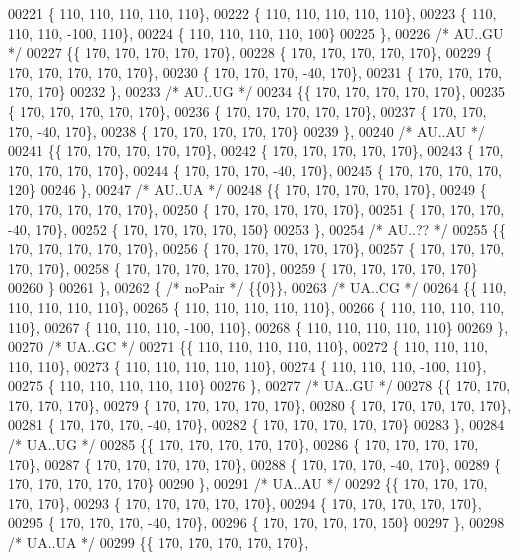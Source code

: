 \begin{DoxyCode}
00221 \{ 110, 110, 110, 110, 110\},
00222 \{ 110, 110, 110, 110, 110\},
00223 \{ 110, 110, 110, -100, 110\},
00224 \{ 110, 110, 110, 110, 100\}
00225 \},
00226 \textcolor{comment}{/* AU..GU */}
00227 \{\{ 170, 170, 170, 170, 170\},
00228 \{ 170, 170, 170, 170, 170\},
00229 \{ 170, 170, 170, 170, 170\},
00230 \{ 170, 170, 170, -40, 170\},
00231 \{ 170, 170, 170, 170, 170\}
00232 \},
00233 \textcolor{comment}{/* AU..UG */}
00234 \{\{ 170, 170, 170, 170, 170\},
00235 \{ 170, 170, 170, 170, 170\},
00236 \{ 170, 170, 170, 170, 170\},
00237 \{ 170, 170, 170, -40, 170\},
00238 \{ 170, 170, 170, 170, 170\}
00239 \},
00240 \textcolor{comment}{/* AU..AU */}
00241 \{\{ 170, 170, 170, 170, 170\},
00242 \{ 170, 170, 170, 170, 170\},
00243 \{ 170, 170, 170, 170, 170\},
00244 \{ 170, 170, 170, -40, 170\},
00245 \{ 170, 170, 170, 170, 120\}
00246 \},
00247 \textcolor{comment}{/* AU..UA */}
00248 \{\{ 170, 170, 170, 170, 170\},
00249 \{ 170, 170, 170, 170, 170\},
00250 \{ 170, 170, 170, 170, 170\},
00251 \{ 170, 170, 170, -40, 170\},
00252 \{ 170, 170, 170, 170, 150\}
00253 \},
00254 \textcolor{comment}{/* AU..?? */}
00255 \{\{ 170, 170, 170, 170, 170\},
00256 \{ 170, 170, 170, 170, 170\},
00257 \{ 170, 170, 170, 170, 170\},
00258 \{ 170, 170, 170, 170, 170\},
00259 \{ 170, 170, 170, 170, 170\}
00260 \}
00261 \},
00262 \{ \textcolor{comment}{/* noPair */} \{\{0\}\},
00263 \textcolor{comment}{/* UA..CG */}
00264 \{\{ 110, 110, 110, 110, 110\},
00265 \{ 110, 110, 110, 110, 110\},
00266 \{ 110, 110, 110, 110, 110\},
00267 \{ 110, 110, 110, -100, 110\},
00268 \{ 110, 110, 110, 110, 110\}
00269 \},
00270 \textcolor{comment}{/* UA..GC */}
00271 \{\{ 110, 110, 110, 110, 110\},
00272 \{ 110, 110, 110, 110, 110\},
00273 \{ 110, 110, 110, 110, 110\},
00274 \{ 110, 110, 110, -100, 110\},
00275 \{ 110, 110, 110, 110, 110\}
00276 \},
00277 \textcolor{comment}{/* UA..GU */}
00278 \{\{ 170, 170, 170, 170, 170\},
00279 \{ 170, 170, 170, 170, 170\},
00280 \{ 170, 170, 170, 170, 170\},
00281 \{ 170, 170, 170, -40, 170\},
00282 \{ 170, 170, 170, 170, 170\}
00283 \},
00284 \textcolor{comment}{/* UA..UG */}
00285 \{\{ 170, 170, 170, 170, 170\},
00286 \{ 170, 170, 170, 170, 170\},
00287 \{ 170, 170, 170, 170, 170\},
00288 \{ 170, 170, 170, -40, 170\},
00289 \{ 170, 170, 170, 170, 170\}
00290 \},
00291 \textcolor{comment}{/* UA..AU */}
00292 \{\{ 170, 170, 170, 170, 170\},
00293 \{ 170, 170, 170, 170, 170\},
00294 \{ 170, 170, 170, 170, 170\},
00295 \{ 170, 170, 170, -40, 170\},
00296 \{ 170, 170, 170, 170, 150\}
00297 \},
00298 \textcolor{comment}{/* UA..UA */}
00299 \{\{ 170, 170, 170, 170, 170\},

\end{DoxyCode}
